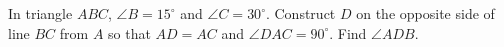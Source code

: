 In triangle $ABC$, $\angle B=15^\circ$ and $\angle C=30^\circ$. Construct $D$ on the opposite side of line $BC$ from $A$ so that $AD=AC$ and $\angle DAC=90^\circ$. Find $\angle ADB$.
